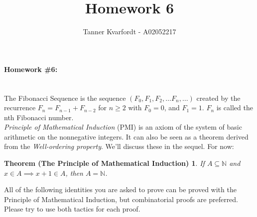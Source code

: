 \documentclass[12pt]{article}
\newcommand{\N}{\mathbb{N}}
\newtheorem*{thm}{Theorem (The Principle of Mathematical Induction)} %
\begin{document}
 
 

 
\title{Homework 6}
\author{Tanner Kvarfordt - A02052217}
\maketitle

\paragraph{\bf Homework \#6:} \hspace{0pt} \\
The Fibonacci Sequence is the sequence $(F_0,F_1,F_2,\dots F_n,\dots)$ created by the recurrence $F_n=F_{n-1}+F_{n-2}$ for $n \geq 2$ with $F_0 = 0$, and $F_1=1$. $F_n$ is called the nth Fibonacci number.\\
\indent \textit{Principle of Mathematical Induction} (PMI) is an axiom of the system of basic arithmetic on the nonnegative integers. It can also be seen as a theorem derived from the \textit{Well-ordering property}. We'll discuss these in the sequel. For now:

\begin{thm}
If $A \subseteq \N$ and $x \in A \implies x +1 \in A$, then $A=\N$.
\end{thm}

\indent All of the following identities you are asked to prove can be proved with the Principle of Mathematical Induction, but combinatorial proofs are preferred. Please try to use both tactics for each proof.

\end{document}
